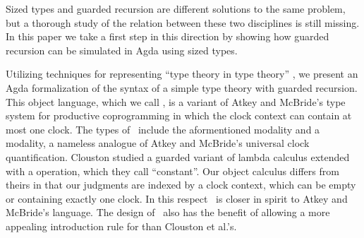 



Sized types and guarded recursion are different solutions to the same
problem, but a thorough study of the relation between these two
disciplines is still missing. In this paper we take a first step in
this direction by showing how guarded recursion can be simulated in
Agda using sized types. 

Utilizing techniques for representing ``type theory in type theory''
\cite{AltenkirchK16,Chapman09}, we present an Agda formalization of
the syntax of a simple type theory with guarded recursion. This object
language, which we call \GTT, is a variant of Atkey and McBride's type
system for productive coprogramming \cite{atkey2013productive} in
which the clock context can contain at most one clock. The types of
\GTT\ include the aformentioned  modality and a  modality,
a nameless analogue of Atkey and McBride's universal clock
quantification. Clouston \etal \cite{CloustonBGB15} studied a
guarded variant of lambda calculus extended with a  operation,
which they call ``constant''.  Our object calculus differs from
theirs in that our judgments are indexed by a clock context, which can
be empty or containing exactly one clock. In this respect \GTT\ is
closer in spirit to Atkey and McBride's language. The design of \GTT\
also has the benefit of allowing a more appealing introduction rule for
\IC{□} than Clouston et al.'s.


